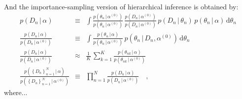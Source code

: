 \documentclass[12pt]{article}
\newcommand{\given}{\,|\,}
\newcommand{\dd}{\mathrm{d}}
\newcommand{\pdf}{{p}}
\newcommand{\setof}[1]{\left\{{#1}\right\}}
\newcommand{\data}{{D_n}}
\newcommand{\setofalldata}{\setof{\data}_{n=1}^N}
\newcommand{\parsymbol}{\theta}
\newcommand{\pars}{\parsymbol_n}
\newcommand{\hyperpars}{\alpha}
\newcommand{\sample}{\parsymbol_{nk}}
\newcommand{\default}[1]{{#1}^{(0)}}
\begin{document}
And the importance-sampling version of hierarchical inference is
obtained by:
\begin{eqnarray}
\pdf(\data\given\hyperpars)
 &\equiv&
\int \frac{\pdf(\pars\given\default{\hyperpars})}{\pdf(\pars\given\default{\hyperpars})}\,\frac{\pdf(\data\given\default{\hyperpars})}{\pdf(\data\given\default{\hyperpars})}\,\pdf(\data\given\pars)\,\pdf(\pars\given\hyperpars)\,\dd\pars
\\
\frac{\pdf(\data\given\hyperpars)}{\pdf(\data\given\default{\hyperpars})} 
 &\equiv&
\int \frac{\pdf(\pars\given\hyperpars)}{\pdf(\pars\given\default{\hyperpars})}\,\pdf(\pars\given\data,\default{\hyperpars})\,\dd\pars
\\
\frac{\pdf(\data\given\hyperpars)}{\pdf(\data\given\default{\hyperpars})} 
 &\approx&
\frac{1}{K}\,\sum_{k=1}^K \frac{\pdf(\sample\given\hyperpars)}{\pdf(\sample\given\default{\hyperpars})}
\\
\frac{\pdf(\setofalldata\given\hyperpars)}{\pdf(\setofalldata\given\default{\hyperpars})} &\equiv& \prod_{n=1}^N \frac{\pdf(\data\given\hyperpars)}{\pdf(\data\given\default{\hyperpars})}
\quad,
\end{eqnarray}
where...
\end{document}
